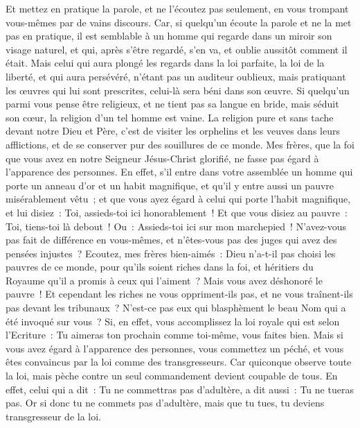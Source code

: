 \begin{multicols}{2}
Et mettez en pratique la parole, et ne l'écoutez pas seulement, en vous trompant vous-mêmes par de vains discours.
Car, si quelqu'un écoute la parole et ne la met pas en pratique, il est semblable à un homme qui regarde dans un miroir son visage naturel,
et qui, après s'être regardé, s'en va, et oublie aussitôt comment il était.
Mais celui qui aura plongé les regards dans la loi parfaite, la loi de la liberté, et qui aura persévéré, n'étant pas un auditeur oublieux, mais pratiquant les œuvres qui lui sont prescrites, celui-là sera béni dans son œuvre.
Si quelqu'un parmi vous pense être religieux, et ne tient pas sa langue en bride, mais séduit son cœur, la religion d'un tel homme est vaine.
La religion pure et sans tache devant notre Dieu et Père, c'est de visiter les orphelins et les veuves dans leurs afflictions, et de se conserver pur des souillures de ce monde.
\VerseOne{}Mes frères, que la foi que vous avez en notre Seigneur Jésus-Christ glorifié, ne fasse pas égard à l'apparence des personnes.
En effet, s'il entre dans votre assemblée un homme qui porte un anneau d'or et un habit magnifique, et qu'il y entre aussi un pauvre misérablement vêtu~;
et que vous ayez égard à celui qui porte l'habit magnifique, et lui disiez~: Toi, assieds-toi ici honorablement~! Et que vous disiez au pauvre~: Toi, tiens-toi là debout~! Ou~: Assieds-toi ici sur mon marchepied~!
N'avez-vous pas fait de différence en vous-mêmes, et n'êtes-vous pas des juges qui avez des pensées injustes~?
Ecoutez, mes frères bien-aimés~: Dieu n'a-t-il pas choisi les pauvres de ce monde, pour qu'ils soient riches dans la foi, et héritiers du Royaume qu'il a promis à ceux qui l'aiment~?
Mais vous avez déshonoré le pauvre~! Et cependant les riches ne vous oppriment-ils pas, et ne vous traînent-ils pas devant les tribunaux~?
N'est-ce pas eux qui blasphèment le beau Nom qui a été invoqué sur vous~?
Si, en effet, vous accomplissez la loi royale qui est selon l'Ecriture~: Tu aimeras ton prochain comme toi-même, vous faites bien.
Mais si vous avez égard à l'apparence des personnes, vous commettez un péché, et vous êtes convaincus par la loi comme des transgresseurs.
Car quiconque observe toute la loi, mais pèche contre un seul commandement devient coupable de tous.
En effet, celui qui a dit~: Tu ne commettras pas d'adultère, a dit aussi~: Tu ne tueras pas. Or si donc tu ne commets pas d'adultère, mais que tu tues, tu deviens transgresseur de la loi.

\end{multicols}
